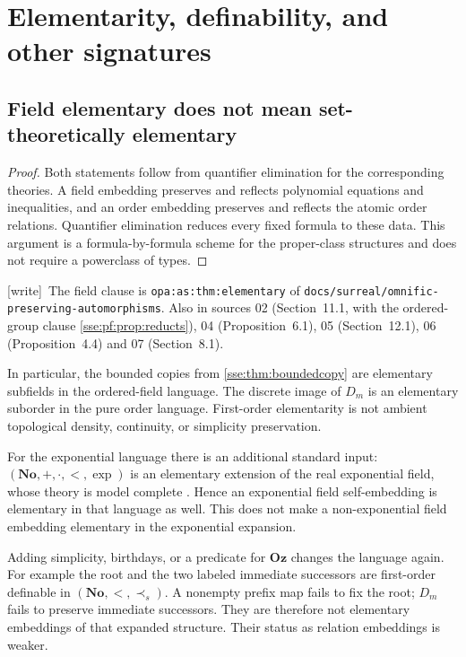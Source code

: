 \documentclass[11pt,a4paper]{article}
\numberwithin{equation}{section}
\theoremstyle{plain}
\newtheorem{proposition}[theorem]{Proposition}
\theoremstyle{definition}
\theoremstyle{remark}
\newcommand{\No}{\mathbf{No}}
\newcommand{\Oz}{\mathbf{Oz}}
\newcommand{\spref}{\prec_s}
\newcommand{\lbl}[1]{\nolinkurl{#1}}%
\newcommand{\fn}[1]{\nolinkurl{#1}}%
\newcommand{\wtag}{\textup{\textsf{[write]}}}%
\newenvironment{wnote}{\par\smallskip\noindent\wtag\ }{\par\smallskip}
\begin{document}
\section{Elementarity, definability, and other signatures}\label{sse:sec:modeltheory}

\subsection{Field elementary does not mean set-theoretically elementary}
\begin{proof}
Both statements follow from quantifier elimination for the corresponding
theories. A field embedding preserves and reflects polynomial equations
and inequalities, and an order embedding preserves and reflects the
atomic order relations. Quantifier elimination reduces every fixed
formula to these data. This argument is a formula-by-formula scheme for
the proper-class structures and does not require a powerclass of types.
\end{proof}
\begin{wnote}The field clause is \lbl{opa:as:thm:elementary} of \fn{docs/surreal/omnific-preserving-automorphisms}. Also in sources 02 (Section~11.1, with the ordered-group clause \cref{sse:pf:prop:reducts}), 04 (Proposition~6.1), 05 (Section~12.1), 06 (Proposition~4.4) and 07 (Section~8.1).\end{wnote}
In particular, the bounded copies from \cref{sse:thm:boundedcopy} are elementary
subfields in the ordered-field language. The discrete image of $D_m$ is an
elementary suborder in the pure order language. First-order elementarity
is not ambient topological density, continuity, or simplicity preservation.

For the exponential language there is an additional standard input:
$(\No,+,\cdot,<,\exp)$ is an elementary extension of the real exponential
field, whose theory is model complete \cite{vdDE,BM,Wilkie}. Hence an
exponential field self-embedding is elementary in that language as well.
This does not make a non-exponential field embedding elementary in the
exponential expansion.

Adding simplicity, birthdays, or a predicate for $\Oz$ changes the
language again. For example the root and the two labeled immediate
successors are first-order definable in $(\No,<,\spref)$. A nonempty
prefix map fails to fix the root; $D_m$ fails to preserve immediate
successors. They are therefore not elementary embeddings of that expanded
structure. Their status as relation embeddings is weaker.
\end{document}
